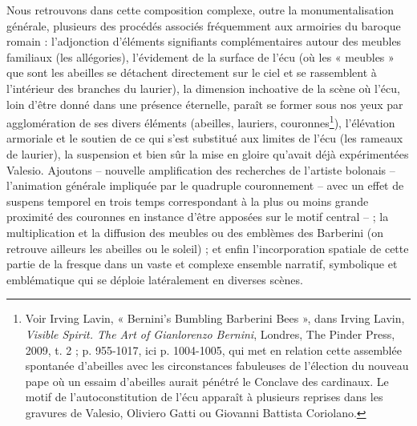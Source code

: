 \documentclass[12pt,twoside,openany]{book}
\begin{document}
Nous retrouvons dans cette composition complexe, outre la monumentalisation générale, plusieurs des procédés associés fréquemment aux armoiries du baroque romain : l’adjonction d’éléments signifiants complémentaires autour des meubles familiaux (les allégories), l’évidement de la surface de l’écu (où les « meubles » que sont les abeilles se détachent directement sur le ciel et se rassemblent à l’intérieur des branches du laurier), la dimension inchoative de la scène où l’écu, loin d’être donné dans une présence éternelle, paraît se former sous nos yeux par agglomération de ses divers éléments (abeilles, lauriers, couronnes\footnote{Voir Irving Lavin, « Bernini’s Bumbling Barberini Bees », dans Irving Lavin, \textit{Visible Spirit. The Art of Gianlorenzo Bernini}, Londres, The Pinder Press, 2009, t. 2 ; p. 955-1017, ici p. 1004-1005, qui met en relation cette assemblée spontanée d’abeilles avec les circonstances fabuleuses de l’élection du nouveau pape où un essaim d’abeilles aurait pénétré le Conclave des cardinaux. Le motif de l’autoconstitution de l’écu apparaît à plusieurs reprises dans les gravures de Valesio, Oliviero Gatti ou Giovanni Battista Coriolano.}), l’élévation armoriale et le soutien de ce qui s’est substitué aux limites de l’écu (les rameaux de laurier), la suspension et bien sûr la mise en gloire qu’avait déjà expérimentées Valesio. Ajoutons – nouvelle amplification des recherches de l’artiste bolonais – l’animation générale impliquée par le quadruple couronnement – avec un effet de suspens temporel en trois temps correspondant à la plus ou moins grande proximité des couronnes en instance d’être apposées sur le motif central – ; la multiplication et la diffusion des meubles ou des emblèmes des Barberini (on retrouve ailleurs les abeilles ou le soleil) ; et enfin l’incorporation spatiale de cette partie de la fresque dans un vaste et complexe ensemble narratif, symbolique et emblématique qui se déploie latéralement en diverses scènes.
\end{document}
